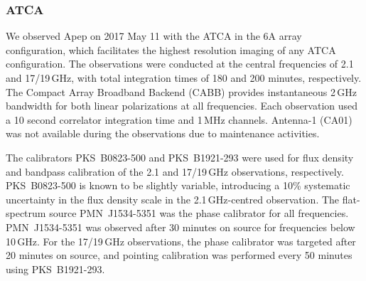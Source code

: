 \documentclass[preprint,times]{aastex61}
\begin{document}

\subsubsection{ATCA}

We observed Apep on 2017 May 11 with the ATCA in the 6A array configuration, which facilitates the highest resolution imaging of any ATCA configuration. The observations were conducted at the central frequencies of 2.1 and 17/19\,GHz, with total integration times of 180 and 200 minutes, respectively. The Compact Array Broadband Backend (CABB) \citep{Wilson2011} provides instantaneous 2\,GHz bandwidth for both linear polarizations at all frequencies. Each observation used a 10 second correlator integration time and 1\,MHz channels. Antenna-1 (CA01) was not available during the observations due to maintenance activities.

The calibrators PKS~B0823-500 and PKS~B1921-293 were used for flux density and bandpass calibration of the 2.1 and 17/19\,GHz observations, respectively. PKS~B0823-500 is known to be slightly variable, introducing a 10\% systematic uncertainty in the flux density scale in the 2.1\,GHz-centred observation. The flat-spectrum source PMN~J1534-5351 was the phase calibrator for all frequencies. PMN~J1534-5351 was observed after 30 minutes on source for frequencies below 10\,GHz. For the 17/19\,GHz observations, the phase calibrator was targeted after 20 minutes on source, and pointing calibration was performed every 50 minutes using PKS~B1921-293.
\end{document}
